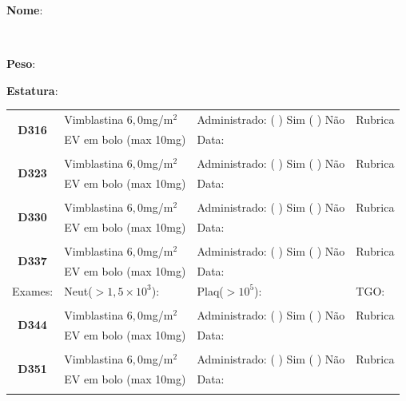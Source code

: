 \documentclass[11pt,a4paper,oldfontcommands]{memoir}
\def\entrywithlabel[#1]#2{\parbox{#1}{{\small #2:} \hrulefill}}
\begin{document}
\begin{center}
\noindent
\entrywithlabel[1\hsize]{\textbf{Nome}}\hfill
\\[0.3cm]
\entrywithlabel[.45\hsize]{\textbf{Peso}}\hfill  \entrywithlabel[.45\hsize]{\textbf{Estatura}}


\begin{table}[H]
\begin{tabular}{p{}p{}|p{}|p{3cm}}

    \hline
    \multicolumn{1}{c|}{\multirow{2}{*}{\textbf{D316}}}&{Vimblastina \(6,0\)mg/m\(^2\)}&{Administrado: (  ) Sim (  ) Não}&{Rubrica}\\
    \multicolumn{1}{c|}{}&{EV em bolo (max 10mg)}&{Data:}&\\
    \hline
   \\
    \hline
    \multicolumn{1}{c|}{\multirow{2}{*}{\textbf{D323}}}&{Vimblastina \(6,0\)mg/m\(^2\)}&{Administrado: (  ) Sim (  ) Não}&{Rubrica}\\
    \multicolumn{1}{c|}{}&{EV em bolo (max 10mg)}&{Data:}&\\
    \hline
    \\
    \hline
    \multicolumn{1}{c|}{\multirow{2}{*}{\textbf{D330}}}&{Vimblastina \(6,0\)mg/m\(^2\)}&{Administrado: (  ) Sim (  ) Não}&{Rubrica}\\
    \multicolumn{1}{c|}{}&{EV em bolo (max 10mg)}&{Data:}&\\
    \hline
    \\
    \hline
    \multicolumn{1}{c|}{\multirow{2}{*}{\textbf{D337}}}&{Vimblastina \(6,0\)mg/m\(^2\)}&{Administrado: (  ) Sim (  ) Não}&{Rubrica}\\
    \multicolumn{1}{c|}{}&{EV em bolo (max 10mg)}&{Data:}&\\
    \hline
    {Exames:}&{Neut(\(>1,5\times10^3\)):}&{Plaq(\(>10^5\)):}&{TGO:}
    \\
    \hline
    \\
    \hline
    \multicolumn{1}{c|}{\multirow{2}{*}{\textbf{D344}}}&{Vimblastina \(6,0\)mg/m\(^2\)}&{Administrado: (  ) Sim (  ) Não}&{Rubrica}\\
    \multicolumn{1}{c|}{}&{EV em bolo (max 10mg)}&{Data:}&\\
    \hline
    \\
    \hline
    \multicolumn{1}{c|}{\multirow{2}{*}{\textbf{D351}}}&{Vimblastina \(6,0\)mg/m\(^2\)}&{Administrado: (  ) Sim (  ) Não}&{Rubrica}\\
    \multicolumn{1}{c|}{}&{EV em bolo (max 10mg)}&{Data:}&\\
    \hline
    \\

\end{tabular}
\end{table}
\end{center}
\end{document}
